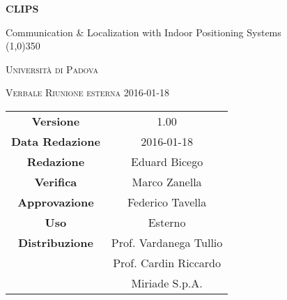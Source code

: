 \documentclass[a4paper,12pt]{article}
\author{Eduard Bicego}
\date{19/01/2016}
\begin{document}
\begin{titlepage}
	\centering
	{\huge\bfseries CLIPS\par}
	Communication \& Localization with Indoor Positioning Systems \\
	\line(1,0){350} \\
	{\scshape\LARGE Università di Padova \par}
	\vspace{1cm}
	{\scshape\Large Verbale Riunione esterna 2016-01-18 \par}
	\logo
	\newpage
	\begin{tabular}{c|c}
		{\hfill \textbf{Versione}} 			& 1.00				\\ 
		{\hfill\textbf{Data Redazione}} 	& 2016-01-18  		\\ 
		{\hfill\textbf{Redazione}} 			& Eduard Bicego		 \\
		{\hfill\textbf{Verifica}} 			& Marco Zanella		\\ 
		{\hfill\textbf{Approvazione}} 		& Federico Tavella	\\ 
		{\hfill\textbf{Uso}} 				& Esterno			\\ 
		{\hfill\textbf{Distribuzione}} 		& Prof. Vardanega Tullio \\
											& Prof. Cardin Riccardo \\
											& Miriade S.p.A. \\ 
	\end{tabular}
\end{titlepage}
	
	\newpage

	
	\label{LastFrontPage}
	

	\newpage
	
	\pagestyle{mymain}
	
	
		

	
		
	
	\newpage
		
	
	\newpage
		
				
	\label{LastPage}
\end{document}
